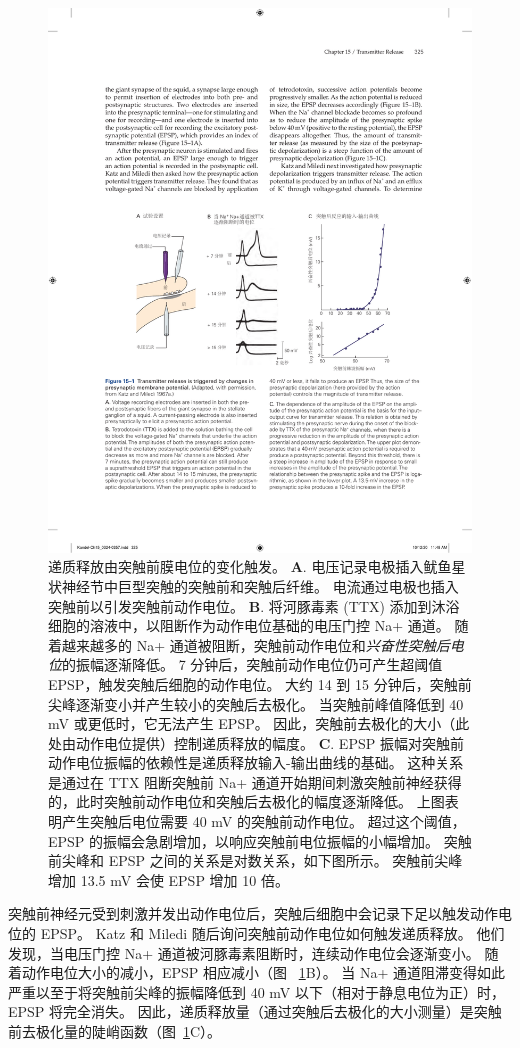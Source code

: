 \begin{figure}[htbp]
	\centering
	\includegraphics[width=0.8\linewidth]{chap15/fig_15_1}
	\caption{递质释放由突触前膜电位的变化触发\cite{katz1967study}。
	\textbf{A}. 电压记录电极插入鱿鱼星状神经节中巨型突触的突触前和突触后纤维。
	电流通过电极也插入突触前以引发突触前动作电位。
	\textbf{B}. 将河豚毒素 (TTX) 添加到沐浴细胞的溶液中，以阻断作为动作电位基础的电压门控 Na+ 通道。
	随着越来越多的 Na+ 通道被阻断，突触前动作电位和\textit{兴奋性突触后电位}的振幅逐渐降低。
	7 分钟后，突触前动作电位仍可产生超阈值 EPSP，触发突触后细胞的动作电位。
	大约 14 到 15 分钟后，突触前尖峰逐渐变小并产生较小的突触后去极化。
	当突触前峰值降低到 40 mV 或更低时，它无法产生 EPSP。
	因此，突触前去极化的大小（此处由动作电位提供）控制递质释放的幅度。
	\textbf{C}. EPSP 振幅对突触前动作电位振幅的依赖性是递质释放输入-输出曲线的基础。
	这种关系是通过在 TTX 阻断突触前 Na+ 通道开始期间刺激突触前神经获得的，此时突触前动作电位和突触后去极化的幅度逐渐降低。
	上图表明产生突触后电位需要 40 mV 的突触前动作电位。
	超过这个阈值，EPSP 的振幅会急剧增加，以响应突触前电位振幅的小幅增加。
	突触前尖峰和 EPSP 之间的关系是对数关系，如下图所示。
	突触前尖峰增加 13.5 mV 会使 EPSP 增加 10 倍。}
	\label{fig:15_1}
\end{figure}


突触前神经元受到刺激并发出动作电位后，突触后细胞中会记录下足以触发动作电位的 EPSP。
Katz 和 Miledi 随后询问突触前动作电位如何触发递质释放。
他们发现，当电压门控 Na+ 通道被河豚毒素阻断时，连续动作电位会逐渐变小。
随着动作电位大小的减小，EPSP 相应减小（图 ~\ref{fig:15_1}B）。
当 Na+ 通道阻滞变得如此严重以至于将突触前尖峰的振幅降低到 40 mV 以下（相对于静息电位为正）时，EPSP 将完全消失。
因此，递质释放量（通过突触后去极化的大小测量）是突触前去极化量的陡峭函数（图~\ref{fig:15_1}C）。


